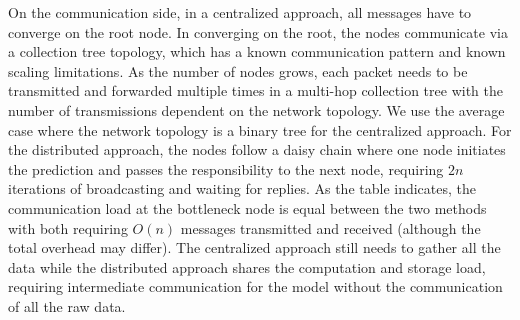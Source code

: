 \documentclass[prodmode,acmtosn]{acmsmall}
\begin{document}
On the communication side, in a centralized approach, all messages have to converge on the root node.
In converging on the root, the nodes communicate via a collection tree topology, which has a known communication pattern and known scaling limitations.
As the number of nodes grows, each packet needs to be transmitted and forwarded multiple times in a multi-hop collection tree with the number of transmissions dependent on the network topology.
We use the average case where the network topology is a binary tree for the centralized approach.
For the distributed approach, the nodes follow a daisy chain where one node initiates the prediction and passes the responsibility to the next node, requiring $2n$ iterations of broadcasting and waiting for replies.
As the table indicates, the communication load at the bottleneck node is equal between the two methods with both requiring $O(n)$ messages transmitted and received (although the total overhead may differ).
The centralized approach still needs to gather all the data while the distributed approach shares the computation and storage load, requiring intermediate communication for the model without the communication of all the raw data.

\begin{table}
\centering
{}
\end{table}
\end{document}
